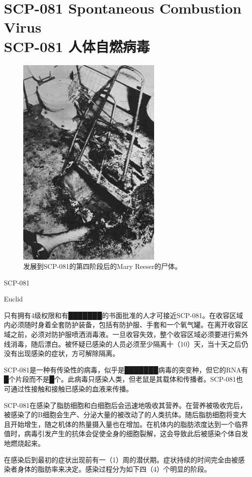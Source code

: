 \chapter[SCP-081 人体自燃病毒]{
    SCP-081 Spontaneous Combustion Virus\\
    SCP-081 人体自燃病毒
}

\label{chap:SCP-081}

\begin{figure}[H]
    \centering
    \includegraphics[width=0.4\linewidth]{images/SCP-081.jpg}
    \caption*{发展到SCP-081的第四阶段后的Mary Reeser的尸体。}
\end{figure}

SCP-081

Euclid

只有拥有4级权限和有███████的书面批准的人才可接近SCP-081。在收容区域内必须随时身着全套防护装备，包括有防护服、手套和一个氧气罐。在离开收容区域之前，必须对防护服喷洒消毒液。一旦收容失效，整个收容区域必须要进行紫外线消毒，随后漂白。被怀疑已感染的人员必须至少隔离十（10）天，当十天之后仍没有出现感染的症状，方可解除隔离。

SCP-081是一种有传染性的病毒，似乎是███████病毒的突变种，但它的RNA有█个片段而不是█个。此病毒只感染人类，但老鼠是其载体和传播者。SCP-081也可通过性接触和接触已感染的血液来传播。

SCP-081在感染了脂肪细胞和白细胞后会迅速地吸收其营养。在营养被吸收完后，被感染了的B细胞会生产、分泌大量的被改动了的人类抗体。随后脂肪细胞将变大且开始增生，随之机体的热量摄入量也在增加。在机体内的脂肪浓度达到一个临界值时，病毒引发产生的抗体会促使全身的细胞裂解，这会导致此后被感染个体自发地燃烧起来。

在感染后到最初的症状出现前有一（1）周的潜伏期。症状持续的时间完全由被感染者身体的脂肪率来决定。感染过程分为如下四（4）个明显的阶段。

